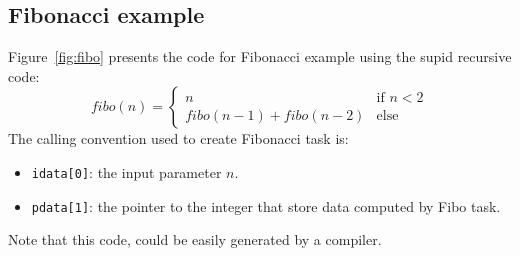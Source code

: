 \documentclass{report}
\begin{document}
\subsection{Fibonacci example}

Figure~\ref{fig:fibo} presents the code for Fibonacci example using the supid recursive code:
$$
fibo(n) = 
\left\{
\begin{array}{ll}
n & \mbox{if } n<2\\
fibo(n-1)+fibo(n-2) & \mbox{else}
\end{array}
\right.
$$
The calling convention used to create Fibonacci task is:
\begin{itemize}
\item \verb+idata[0]+: the input parameter $n$.
\item \verb+pdata[1]+: the pointer to the integer that store data computed by Fibo task.
\end{itemize}
Note that this code, could be easily generated by a compiler.
\end{document}

